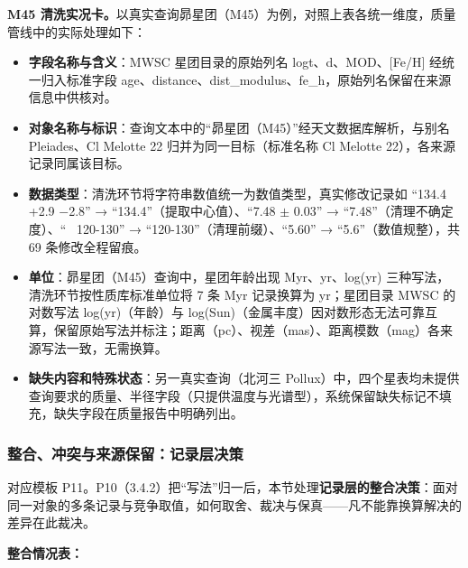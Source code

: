 \noindent\textbf{M45 清洗实况卡。}以真实查询昴星团（M45）为例，对照上表各统一维度，质量管线中的实际处理如下：

\begin{itemize}[leftmargin=1.2em,itemsep=1pt]
\item \textbf{字段名称与含义}：MWSC 星团目录的原始列名 logt、d、MOD、[Fe/H] 经统一归入标准字段 age、distance、dist\_modulus、fe\_h，原始列名保留在来源信息中供核对。
\item \textbf{对象名称与标识}：查询文本中的“昴星团（M45）”经天文数据库解析，与别名 Pleiades、Cl Melotte 22 归并为同一目标（标准名称 Cl Melotte 22），各来源记录同属该目标。
\item \textbf{数据类型}：清洗环节将字符串数值统一为数值类型，真实修改记录如 “134.4 +2.9 $-$2.8” → “134.4”（提取中心值）、“7.48 $\pm$ 0.03” → “7.48”（清理不确定度）、“~ 120-130” → “120-130”（清理前缀）、“5.60” → “5.6”（数值规整），共 69 条修改全程留痕。
\item \textbf{单位}：昴星团（M45）查询中，星团年龄出现 Myr、yr、log(yr) 三种写法，清洗环节按性质库标准单位将 7 条 Myr 记录换算为 yr；星团目录 MWSC 的对数写法 log(yr)（年龄）与 log(Sun)（金属丰度）因对数形态无法可靠互算，保留原始写法并标注；距离（pc）、视差（mas）、距离模数（mag）各来源写法一致，无需换算。
\item \textbf{缺失内容和特殊状态}：另一真实查询（北河三 Pollux）中，四个星表均未提供查询要求的质量、半径字段（只提供温度与光谱型），系统保留缺失标记不填充，缺失字段在质量报告中明确列出。
\end{itemize}

\subsubsection{整合、冲突与来源保留：记录层决策}

对应模板 P11。P10（3.4.2）把“写法”归一后，本节处理\textbf{记录层的整合决策}：面对同一对象的多条记录与竞争取值，如何取舍、裁决与保真——凡不能靠换算解决的差异在此裁决。

\noindent\textbf{整合情况表：}

